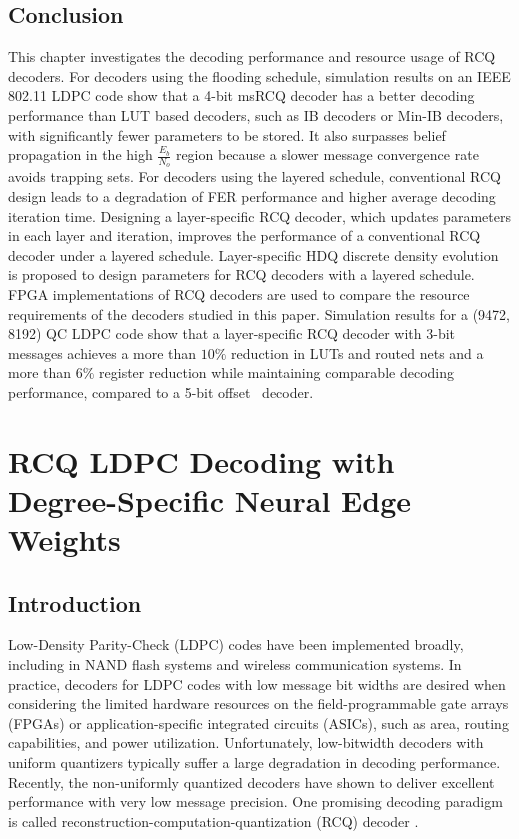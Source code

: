 \documentclass [PhD] {uclathes}
\begin{document}
\section{Conclusion}\label{sec: conclusion}
This chapter investigates the decoding performance and resource usage of RCQ decoders. For decoders using the flooding schedule, simulation results on an IEEE 802.11 LDPC code show that a 4-bit msRCQ decoder has a better decoding performance than LUT based decoders, such as IB decoders or Min-IB decoders, with significantly fewer parameters to be stored. It also surpasses belief propagation in the high $\frac{E_b}{N_o}$ region because a slower message convergence rate avoids trapping sets. For decoders using the layered schedule, conventional RCQ design leads to a degradation of FER performance and higher average decoding iteration time. Designing a layer-specific RCQ decoder, which updates parameters in each layer and iteration, improves the performance of a conventional RCQ decoder under a layered schedule.
Layer-specific HDQ discrete density evolution is proposed to design parameters for RCQ decoders with a layered schedule. FPGA implementations of RCQ decoders are used to compare the resource requirements of the decoders studied in this paper. 
Simulation results for a (9472, 8192) QC LDPC code show that a layer-specific \minsum RCQ decoder with 3-bit messages achieves a more than $10\%$ reduction in LUTs and routed nets and a more than $6\%$ register reduction while maintaining comparable decoding performance, compared to a 5-bit offset \minsum~decoder.

\chapter{RCQ LDPC Decoding with Degree-Specific Neural Edge Weights}
\section{Introduction}
Low-Density Parity-Check  (LDPC) codes \cite{GallagerPhD1963} have been implemented broadly, including in NAND flash systems and wireless communication systems. In practice, decoders for LDPC codes with low message bit widths are desired when considering the limited hardware resources on the field-programmable gate arrays (FPGAs) or application-specific integrated circuits (ASICs), such as area, routing capabilities, and power utilization. Unfortunately, low-bitwidth decoders with uniform quantizers typically suffer a large degradation in decoding performance\cite{Lee2005-RFQThorpe}. Recently, the non-uniformly quantized decoders  \cite{Planjery2012-FAID,Xiao2020-sb, Lewandowsky2018-IB,Stark2018-IBMA,Stark2019-IBPBRL,Lee2005-RFQThorpe,He2019-RFQCai, Wang2020-kh,terrill2021fpga,wang2022TCOMRCQ}  have shown to deliver excellent performance with very low message precision. One promising decoding paradigm is called reconstruction-computation-quantization (RCQ) decoder \cite{Wang2020-kh,terrill2021fpga,wang2022TCOMRCQ}. 
 
\end{document}

